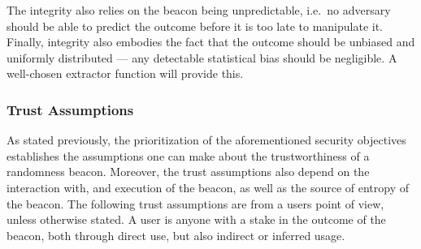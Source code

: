 \begin{description}
        The integrity also relies on the beacon being unpredictable, i.e.\ no adversary  should be able to predict the outcome before it is too late to manipulate it.
        Finally, integrity also embodies the fact that the outcome should be unbiased and uniformly distributed --- any detectable statistical bias should be negligible. A well-chosen extractor function will provide this.

\end{description}

\subsubsection{Trust Assumptions}\label{ssub:trust_assumptions}
As stated previously, the prioritization of the aforementioned security objectives establishes the assumptions one can make about the trustworthiness of a randomness beacon.
Moreover, the trust assumptions also depend on the interaction with, and execution of the beacon, as well as the source of entropy of the beacon.
The following trust assumptions are from a users point of view, unless otherwise stated.
A user is anyone with a stake in the outcome of the beacon, both through direct use, but also indirect or inferred usage.
